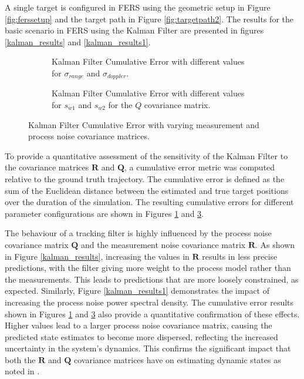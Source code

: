 A single target is configured in \ac{FERS} using the geometric setup in Figure \ref{fig:ferssetup} and the target path in Figure \ref{fig:targetpath2}. The results for the basic scenario in \ac{FERS} using the Kalman Filter are presented in figures \ref{kalman_results} and \ref{kalman_results1}.
\newline
\begin{figure}[H]
    \centering
    \begin{subfigure}[b]{0.49\linewidth}
        \centering
        
        \caption{Kalman Filter Cumulative Error with different values for \(\sigma_{range}\) and \(\sigma_{doppler}\).}
        \label{kalman_results_cum}
    \end{subfigure}
    \hfill
    \begin{subfigure}[b]{0.49\linewidth}
        \centering
        
        \caption{Kalman Filter Cumulative Error with different values for \(s_{w1}\) and \(s_{w2}\) for the \(Q\) covariance matrix.}
        \label{kalman_results_cum1}
    \end{subfigure}
    \caption{ Kalman Filter Cumulative Error with varying measurement and process noise covariance matrices.}
\end{figure}
To provide a quantitative assessment of the sensitivity of the Kalman Filter to the covariance matrices $\mathbf{R}$ and $\mathbf{Q}$, a cumulative error metric was computed relative to the ground truth trajectory. The cumulative error is defined as the sum of the Euclidean distance between the estimated and true target positions over the duration of the simulation. The resulting cumulative errors for different parameter configurations are shown in Figures \ref{kalman_results_cum} and \ref{kalman_results_cum1}.

The behaviour of a tracking filter is highly influenced by the process noise covariance matrix $\mathbf{Q}$ and the measurement noise covariance matrix $\mathbf{R}$. As shown in Figure \ref{kalman_results}, increasing the values in $\mathbf{R}$ results in less precise predictions, with the filter giving more weight to the process model rather than the measurements. This leads to predictions that are more loosely constrained, as expected. Similarly, Figure \ref{kalman_results1} demonstrates the impact of increasing the process noise power spectral density. The cumulative error results shown in Figures \ref{kalman_results_cum} and \ref{kalman_results_cum1} also provide a quantitative confirmation of these effects. Higher values lead to a larger process noise covariance matrix, causing the predicted state estimates to become more dispersed, reflecting the increased uncertainty in the system's dynamics. This confirms the significant impact that both the $\mathbf{R}$ and $\mathbf{Q}$ covariance matrices have on estimating dynamic states as noted in \cite{Akhlaghi2018}.



